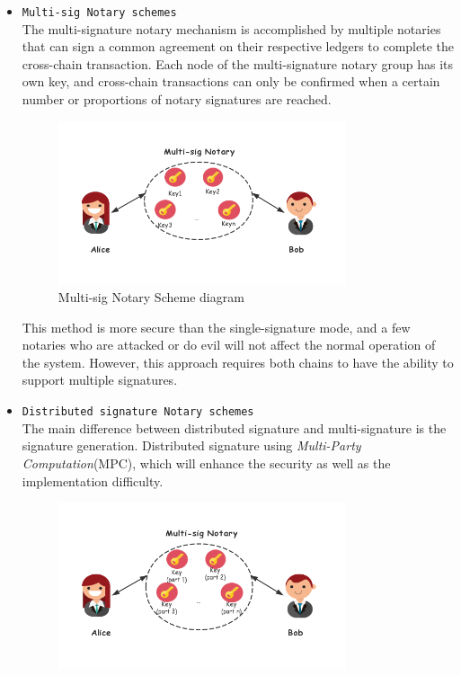\begin{itemize}
\begin{itemize}
        \item \texttt{Multi-sig Notary schemes}\\
       The multi-signature notary mechanism is accomplished by multiple notaries that can sign a common agreement on their respective ledgers to complete the cross-chain transaction. Each node of the multi-signature notary group has its own key, and cross-chain transactions can only be confirmed when a certain number or proportions of notary signatures are reached.

        \begin{figure}[H]
        \includegraphics[width=0.8\textwidth]{./figures/mnotary.png}
        \centering
        \caption{Multi-sig Notary Scheme diagram}%
        \centering
        \label{fig:mno}
        \end{figure}
       This method is more secure than the single-signature mode, and a few notaries who are attacked or do evil will not affect the normal operation of the system. However, this approach requires both chains to have the ability to support multiple signatures.
        \item  \texttt{Distributed signature Notary schemes} \\
        The main difference between distributed signature and multi-signature is the signature generation. Distributed signature using \textit{Multi-Party Computation}(MPC), which will enhance the security as well as the implementation difficulty.
        \begin{figure}[H]
        \includegraphics[width=0.8\textwidth]{./figures/dnotary.png}

\end{figure}
\end{itemize}
\end{itemize}
